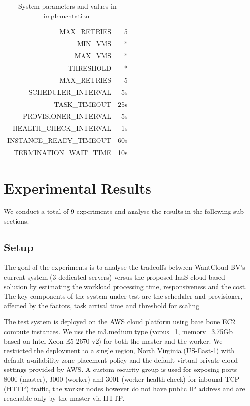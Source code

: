 \documentclass[a4paper]{IEEEtran}
\begin{document}
\begin{table}[tbp]
  \centering
  \caption{System parameters and values in implementation.}
  \label{table:system_params}
  \begin{tabular}{|r|r|}
    \hline
     MAX\_RETRIES & 5 \\
     MIN\_VMS & * \\
     MAX\_VMS & * \\
     THRESHOLD & * \\
     MAX\_RETRIES & 5 \\
     SCHEDULER\_INTERVAL & 5s \\
     TASK\_TIMEOUT & 25s \\
     PROVISIONER\_INTERVAL & 5s \\
     HEALTH\_CHECK\_INTERVAL & 1s \\
     INSTANCE\_READY\_TIMEOUT & 60s \\
     TERMINATION\_WAIT\_TIME & 10s \\
     \hline
  \end{tabular}
\end{table}

\section{Experimental Results} \label{experiments}

We conduct a total of 9 experiments and analyse the results in the following sub-sections.

\subsection{Setup}

The goal of the experiments is to analyse the tradeoffs between WantCloud BV's current 
system (3 dedicated servers) versus the proposed IaaS cloud based solution by estimating the workload
processing time, responsiveness and the cost. The key components of the system under test are the scheduler
and provisioner, affected by the factors, task arrival time and threshold for scaling.

The test system is deployed on the AWS cloud platform using bare bone EC2 compute instances. We
use the m3.medium type (vcpus=1, memory=3.75Gb based on Intel Xeon E5-2670 v2) for both the master and the worker. 
We restricted the deployment to a single region, North Virginia (US-East-1) with default availability zone placement policy and the default 
virtual private cloud settings provided by AWS. A custom security group is used for exposing ports 8000 (master),
 3000 (worker) and 3001 (worker health check) for inbound TCP (HTTP) traffic, the worker nodes however do not 
 have public IP address and are reachable only by the master via HTTP.
\end{document}
